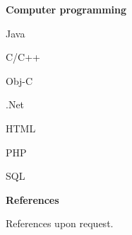 \documentclass[a4paper,12pt,final]{memoir}
\newcommand{\Sep}{\vspace{1.5em}}
\newcommand{\SmallSep}{\vspace{0.5em}}
\newcommand{\CVSection}[1]
	{\Large\textbf{#1}\par
	\SmallSep\normalsize\normalfont}
\newcommand{\CVItem}[1]
	{\textbf{\color{RoyalBlue} #1}}
\begin{document}
\CVItem{Computer programming}
\begin{multicols}{2}
\begin{compactitem}[\color{RoyalBlue}$\circ$]
	\item Java
    \item C/C++
	\item Obj-C 
	\item .Net 
	\item HTML
	\item PHP
	\item SQL
\end{compactitem}
\end{multicols}
\Sep 

\CVSection{References}
References upon request.

\end{document}

